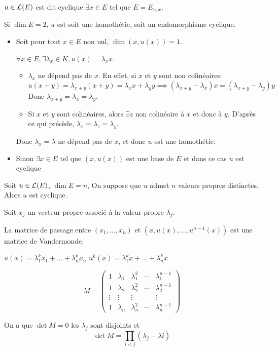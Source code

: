 \begin{definition}
	$u \in \mathcal{L}(E)$ est dit cyclique \ssi $\exists x \in E$ tel que $E = E_{u,x}$.
\end{definition}

\begin{example}
	Si $\dim E = 2$, $u$ est soit une homothétie, soit un endomorphisme cyclique.

	\begin{itemize}
		\item Soit pour tout $x \in E$ non nul, $\dim (x, u(x)) = 1$.

		      $\forall x \in E, \exists \lambda_x \in K, u(x) = \lambda_x x$.

		      \begin{itemize}
			      \item $\lambda_x$ ne dépend pas de $x$. En effet, si $x$ et $y$ sont non colinéaires:
			            $$ u (x+y) = \lambda_{x+y} (x+y) = \lambda_x x + \lambda_y y \implies (\lambda_{x+y} - \lambda_x) x = (\lambda_{x+y} - \lambda_y) y$$
			            Donc $\lambda_{x+y} = \lambda_x = \lambda_y$.

			      \item Si $x$ et $y$ sont colinéaires, alors $\exists z$ non colinéaire à $x$ et donc à $y$. D'après ce qui précède, $\lambda_x = \lambda_z = \lambda_y$.
		      \end{itemize}

		      Donc $\lambda_x = \lambda$ ne dépend pas de $x$, et donc $u$ est une homothétie.

		\item Sinon $\exists x \in E$ tel que $(x, u(x))$ est une base de $E$ et dans ce cas $u$ est cyclique
	\end{itemize}
\end{example}

\begin{example}
	Soit $u \in \mathcal{L}(E)$, $\dim E = n$, On suppose que $u$ admet $n$ valeurs propres distinctes. Alors $u$ est cyclique.

	Soit $x_j$ un vecteur propre associé à la valeur propre $\lambda_j$.

	La matrice de passage entre $(x_1, \dots, x_n)$ et $(x, u(x), \dots, u^{n-1}(x))$ est une matrice de Vandermonde.

	$u(x) = \lambda_1^k x_1 + \dots + \lambda_n^{k}x_n$
	$u^k(x) = \lambda_1^k x + \dots + \lambda_n^{k}x$

	\begin{equation*}
		M = \begin{pmatrix}
			1      & \lambda_1 & \lambda_1^2 & \cdots & \lambda_1^{n-1} \\
			1      & \lambda_2 & \lambda_2^2 & \cdots & \lambda_2^{n-1} \\
			\vdots & \vdots    & \vdots      &        & \vdots          \\
			1      & \lambda_n & \lambda_n^2 & \cdots & \lambda_n^{n-1}
		\end{pmatrix}
	\end{equation*}

	On a que $\det M = 0 $ \ssi les $\lambda_j$ sont disjoints et
	$$ \det M = \prod_{i < j} (\lambda_j-\lambda i)$$
\end{example}

